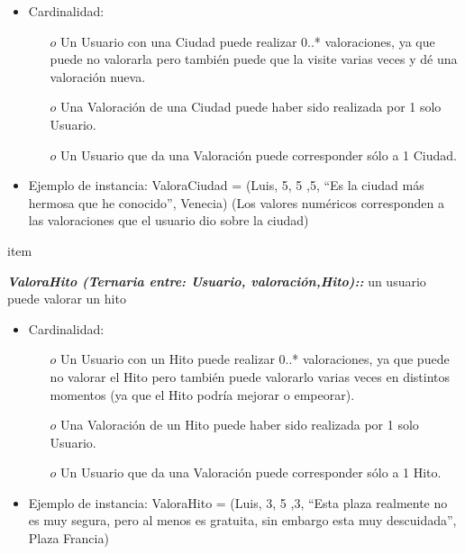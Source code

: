 \documentclass[a4paper]{article}
\begin{document}
\begin{itemize}
{\begin{itemize}
  \item Cardinalidad:
  
  
  \begin{itemize}
\item[$o$]Un Usuario con una Ciudad puede realizar 0..* valoraciones, ya que puede no valorarla pero también puede que la visite varias veces y dé una valoración nueva.
\item[$o$] Una Valoración de una Ciudad puede haber sido realizada por 1 solo Usuario.
\item[$o$]Un Usuario que da una Valoración puede corresponder sólo a 1 Ciudad.

\end{itemize}




\item Ejemplo de instancia: ValoraCiudad = {(Luis, 5, 5 ,5, “Es la ciudad más hermosa que he conocido”, Venecia)} (Los valores numéricos corresponden a las valoraciones que el usuario dio sobre la ciudad)

 \end{itemize}



}





item{

  
	\textbf{\textit{ValoraHito (Ternaria entre: Usuario, valoración,Hito)::}}
     un usuario puede valorar un hito 
        
        
 \begin{itemize}
        
  \item Cardinalidad:
  
  
  \begin{itemize}
\item[$o$]Un Usuario con un Hito puede realizar 0..* valoraciones, ya que puede no valorar el Hito pero también puede valorarlo varias veces en distintos momentos (ya que el Hito podría mejorar o empeorar).
\item[$o$]Una Valoración de un Hito puede haber sido realizada por 1 solo Usuario.
\item[$o$] Un Usuario que da una Valoración puede corresponder sólo a 1 Hito.

\end{itemize}




\item Ejemplo de instancia: ValoraHito = {(Luis, 3, 5 ,3, “Esta plaza realmente no es muy segura, pero al menos es gratuita, sin embargo esta muy descuidada”, Plaza Francia)}


\end{itemize}}
\end{itemize}
\end{document}

